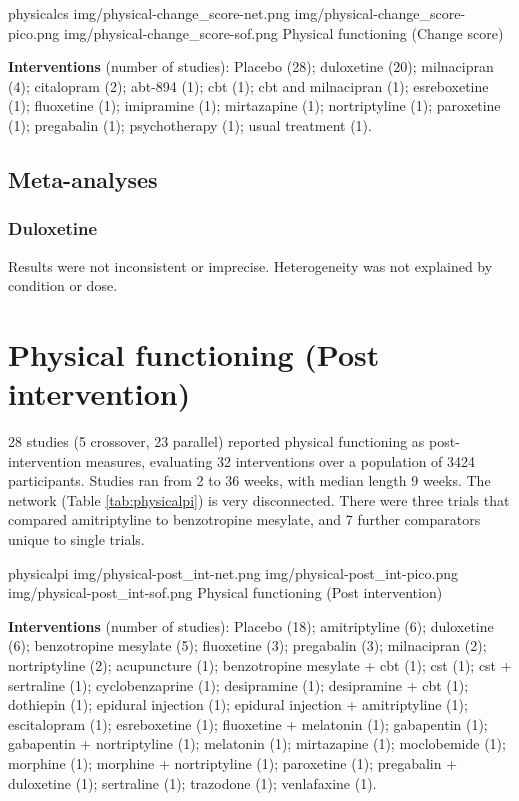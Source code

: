 \documentclass{report}\usepackage[]{graphicx}\usepackage[]{color}
\begin{document}
\soffignew
{physicalcs}
{img/physical-change_score-net.png}
{img/physical-change_score-pico.png}
{img/physical-change_score-sof.png}
{Physical functioning (Change score)}

\textbf{Interventions} (number of studies): Placebo (28); duloxetine (20); milnacipran (4); citalopram (2); abt-894 (1); cbt (1); cbt and milnacipran (1); esreboxetine (1); fluoxetine (1); imipramine (1); mirtazapine (1); nortriptyline (1); paroxetine (1); pregabalin (1); psychotherapy (1); usual treatment (1).

\subsection{Meta-analyses}

\subsubsection{Duloxetine}

Results were not inconsistent or imprecise. Heterogeneity was not explained by condition or dose.

\section{Physical functioning (Post intervention)}

28 studies (5 crossover, 23 parallel) reported physical functioning as post-intervention measures, evaluating 32 interventions over a population of 3424 participants. Studies ran from 2 to 36 weeks, with median length 9 weeks. The network (Table \ref{tab:physicalpi}) is very disconnected. There were three trials that compared amitriptyline to benzotropine mesylate, and 7 further comparators unique to single trials.


\soffignew
{physicalpi}
{img/physical-post_int-net.png}
{img/physical-post_int-pico.png}
{img/physical-post_int-sof.png}
{Physical functioning (Post intervention)}

\textbf{Interventions} (number of studies): Placebo (18); amitriptyline (6); duloxetine (6); benzotropine mesylate (5); fluoxetine (3); pregabalin (3); milnacipran (2); nortriptyline (2); acupuncture (1); benzotropine mesylate + cbt (1); cst (1); cst + sertraline (1); cyclobenzaprine (1); desipramine (1); desipramine + cbt (1); dothiepin (1); epidural injection (1); epidural injection + amitriptyline (1); escitalopram (1); esreboxetine (1); fluoxetine + melatonin (1); gabapentin (1); gabapentin + nortriptyline (1); melatonin (1); mirtazapine (1); moclobemide (1); morphine (1); morphine + nortriptyline (1); paroxetine (1); pregabalin + duloxetine (1); sertraline (1); trazodone (1); venlafaxine (1).
\end{document}
